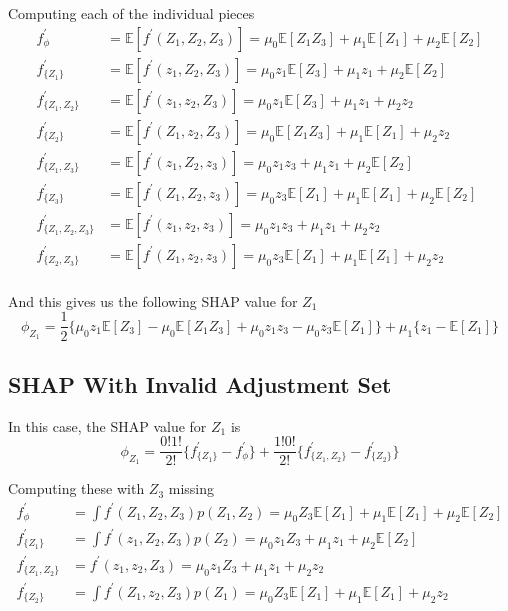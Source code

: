 \documentclass{article}
\begin{document}
Computing each of the individual pieces
\begin{align*}
f^\prime_{\phi} &= \mathbb{E}[f^\prime(Z_1, Z_2, Z_3)] = \mu_0 \mathbb{E}[Z_1Z_3] + \mu_1\mathbb{E}[Z_1] + \mu_2\mathbb{E}[Z_2]\\
f^\prime_{\{Z_1\}} &= \mathbb{E}[f^\prime(z_1, Z_2, Z_3)] = \mu_0 z_1 \mathbb{E}[Z_3] + \mu_1z_1 + \mu_2\mathbb{E}[Z_2]\\
f^\prime_{\{Z_1, Z_2\}} &= \mathbb{E}[f^\prime(z_1, z_2, Z_3)] = \mu_0 z_1 \mathbb{E}[Z_3] + \mu_1z_1 + \mu_2 z_2\\
f^\prime_{\{Z_2\}} &= \mathbb{E}[f^\prime(Z_1, z_2, Z_3)] = \mu_0 \mathbb{E}[Z_1Z_3] + \mu_1\mathbb{E}[Z_1] + \mu_2 z_2\\
f^\prime_{\{Z_1, Z_3\}} &= \mathbb{E}[f^\prime(z_1, Z_2, z_3)] = \mu_0 z_1 z_3 + \mu_1z_1 + \mu_2 \mathbb{E}[Z_2]\\
f^\prime_{\{Z_3\}} &= \mathbb{E}[f^\prime(Z_1, Z_2, z_3)] = \mu_0 z_3\mathbb{E}[Z_1] + \mu_1\mathbb{E}[Z_1] + \mu_2 \mathbb{E}[Z_2]\\
f^\prime_{\{Z_1, Z_2, Z_3\}} &= \mathbb{E}[f^\prime(z_1, z_2, z_3)] = \mu_0 z_1 z_3 + \mu_1z_1 + \mu_2 z_2\\
f^\prime_{\{Z_2, Z_3\}} &= \mathbb{E}[f^\prime(Z_1, z_2, z_3)] = \mu_0 z_3\mathbb{E}[Z_1] + \mu_1\mathbb{E}[Z_1] + \mu_2 z_2\\
\end{align*}

And this gives us the following SHAP value for $Z_1$
\[
\phi_{Z_1} = \frac{1}{2}\Bigg\{ \mu_0 z_1\mathbb{E}[Z_3] - \mu_0 \mathbb{E}[Z_1 Z_3] + \mu_0 z_1 z_3 - \mu_0z_3 \mathbb{E}[Z_1] \Bigg\}  + \mu_1 \Bigg\{z_1 - \mathbb{E}[Z_1] \Bigg\}
\]

\subsection{SHAP With Invalid Adjustment Set}

In this case, the SHAP value for $Z_1$ is
\[
\phi_{Z_1} = \frac{0!1!}{2!}\Big\{ f^\prime_{\{Z_1\}} - f^\prime_{\phi}\Big\}  + \frac{1!0!}{2!}\Big\{f^\prime_{\{Z_1, Z_2 \}} - f^\prime_{\{Z_2 \}}\Big\}
\] 

Computing these with $Z_3$ missing 
\begin{align*}
f^\prime_{\phi} &= \int f^\prime(Z_1, Z_2, Z_3)p(Z_1, Z_2) = \mu_0 Z_3\mathbb{E}[Z_1] + \mu_1\mathbb{E}[Z_1] + \mu_2\mathbb{E}[Z_2]\\
f^\prime_{\{Z_1\}} &= \int f^\prime(z_1, Z_2, Z_3)p(Z_2) = \mu_0 z_1 Z_3 + \mu_1z_1 + \mu_2\mathbb{E}[Z_2]\\
f^\prime_{\{Z_1, Z_2\}} &= f^\prime(z_1, z_2, Z_3) = \mu_0 z_1 Z_3 + \mu_1z_1 + \mu_2 z_2\\
f^\prime_{\{Z_2\}} &= \int f^\prime(Z_1, z_2, Z_3)p(Z_1) = \mu_0 Z_3 \mathbb{E}[Z_1] + \mu_1\mathbb{E}[Z_1] + \mu_2 z_2\\
\end{align*}
\end{document}
